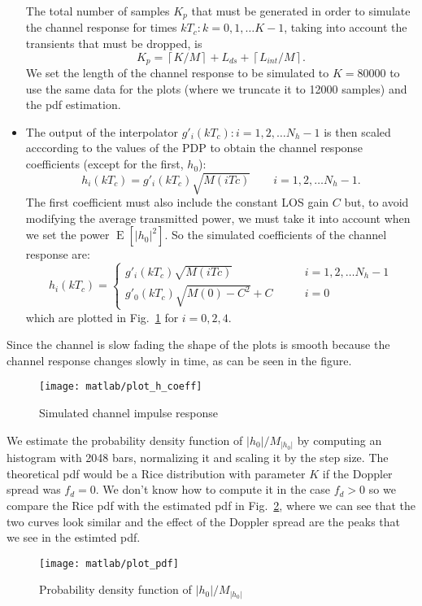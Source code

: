 \documentclass[a4paper,oneside]{article}
\newcommand{\E}[1]{\operatorname{E}\left[#1\right]}
\newcommand{\abs}[1]{\left|#1\right|}
\newcommand{\ceil}[1]{\left\lceil#1\right\rceil}
\begin{document}
\begin{itemize}
      The total number of samples $K_p$ that must be generated in
      order to simulate the channel response for times $kT_c :
      k=0,1,\dots K-1$, taking into account the transients that must
      be dropped, is
      \begin{equation}
        K_p = \ceil{K/M} + L_{ds} + \ceil{L_{int}/M} .
        \label{eq:Kp}
      \end{equation}
      We set the length of the channel response to be simulated to
      $K=80000$ to use the same data for the plots (where we truncate
      it to 12000 samples) and the pdf estimation.
      \item The output of the interpolator $g'_i(kT_c) : i=1,2,\dots
        N_h-1$ is then scaled acccording to the values of the PDP to
        obtain the channel response coefficients (except for the
        first, $h_0$):
        \begin{equation}
          h_i(kT_c) = g'_i(kT_c) \sqrt{M(iTc)} \qquad i=1,2,\dots N_h-1 .
        \end{equation}
        The first coefficient must also include the constant LOS gain
        $C$ but, to avoid modifying the average transmitted power, we
        must take it into account when we set the power
        $\E{\abs{h_0}^2}$. So the simulated coefficients of the
        channel response are:
        \begin{equation}
          h_i(kT_c) = \begin{cases}
            g'_i(kT_c) \sqrt{M(iTc)} \qquad & i=1,2,\dots N_h-1 \\
            g'_0(kT_c) \sqrt{M(0) - C^2} + C \qquad & i=0
            \end{cases}
        \end{equation}
        which are plotted in Fig.~\ref{plot:h_coeff} for $i=0,2,4$.
\end{itemize}
Since the channel is slow fading the shape of the plots is smooth
because the channel response changes slowly in time, as can be seen in
the figure.
\begin{figure}[p]
  \centering
  \texttt{[image: matlab/plot\_h\_coeff]}
  \caption{Simulated channel impulse response}
  \label{plot:h_coeff}
\end{figure}

We estimate the probability density function of
$\abs{h_0}/M_{\abs{h_0}}$ by computing an histogram with 2048 bars,
normalizing it and scaling it by the step size. The theoretical pdf
would be a Rice distribution with parameter $K$ if the Doppler spread was $f_d =
0$. We don't know how to compute it in the case $f_d > 0$ so we
compare the Rice pdf with the estimated pdf in Fig.~\ref{plot:pdf},
where we can see that the two curves look similar and the effect of
the Doppler spread are the peaks that we see in the estimted pdf.
\begin{figure}[htbp]
  \centering
  \texttt{[image: matlab/plot\_pdf]}
  \caption{Probability density function of $\abs{h_0}/M_{\abs{h_0}}$}
  \label{plot:pdf}
\end{figure}
\end{document}

